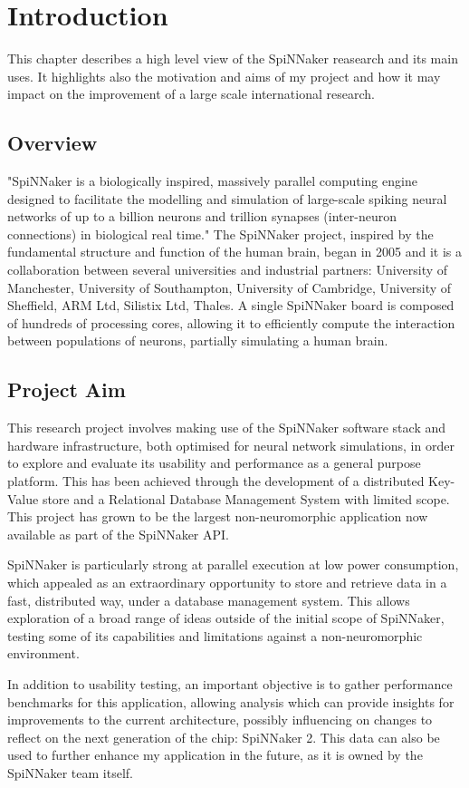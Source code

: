 \chapter{Introduction}
\label{cha:intro}

This chapter describes a high level view of the SpiNNaker reasearch and its main uses. It highlights also the motivation and aims of my project and how it may impact on the improvement of a large scale international research.

\section{Overview}
\label{sec:overview}

"SpiNNaker is a biologically inspired, massively parallel computing engine designed to facilitate the modelling and simulation of large-scale spiking neural networks of up to a billion neurons and trillion synapses (inter-neuron connections) in biological real time." \cite{painkras} The SpiNNaker project, inspired by the fundamental structure and function of the human brain, began in 2005 and it is a collaboration between several universities and industrial partners: University of Manchester, University of Southampton, University of Cambridge, University of Sheffield, ARM Ltd, Silistix Ltd, Thales. \cite{spinnproject} A single SpiNNaker board is composed of hundreds of processing cores, allowing it to efficiently compute the interaction between populations of neurons, partially simulating a human brain.

\section{Project Aim}
\label{sec:aim}

This research project involves making use of the SpiNNaker software stack and hardware infrastructure, both optimised for neural network simulations, in order to explore and evaluate its usability and performance as a general purpose platform. This has been achieved through the development of a distributed Key-Value store and a Relational Database Management System with limited scope. 
This project has grown to be the largest non-neuromorphic application now available as part of the SpiNNaker API.

SpiNNaker is particularly strong at parallel execution at low power consumption, which appealed as an extraordinary opportunity to store and retrieve data in a fast, distributed way, under a database management system. This allows exploration of a broad range of ideas outside of the initial scope of SpiNNaker, testing some of its capabilities and limitations against a non-neuromorphic environment.

In addition to usability testing, an important objective is to gather performance benchmarks for this application, allowing analysis which can provide insights for improvements to the current architecture, possibly influencing on changes to reflect on the next generation of the chip: SpiNNaker 2. This data can also be used to further enhance my application in the future, as it is owned by the SpiNNaker team itself.


